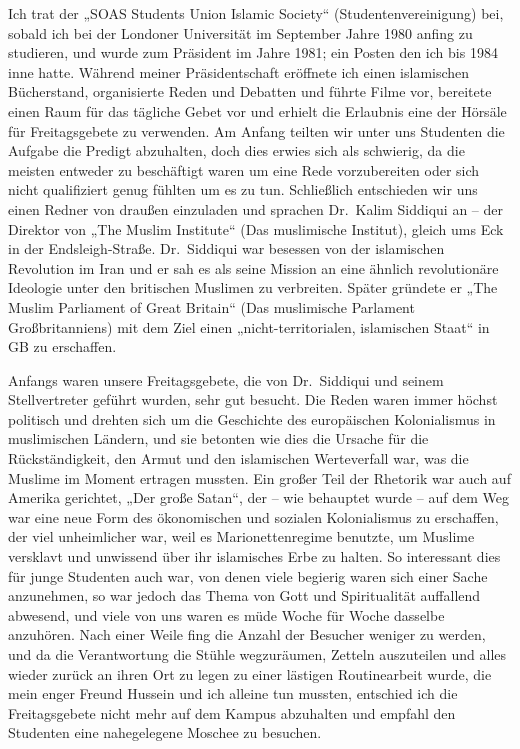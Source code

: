 \documentclass[12pt]{memoir}
\def\–{-\hskip0pt}
\begin{document}
Ich trat der „SOAS Students Union Islamic Society“ (Studentenvereinigung) bei,
sobald ich bei der Londoner Universität
im September Jahre 1980 anfing zu studieren,
und wurde zum Präsident im Jahre 1981;
ein Posten den ich bis 1984 inne hatte.
Während meiner Präsidentschaft eröffnete ich einen islamischen Bücherstand,
organisierte Reden und Debatten und führte Filme vor,
bereitete einen Raum für das tägliche Gebet vor
und erhielt die Erlaubnis eine der Hörsäle für Freitagsgebete zu verwenden.
Am Anfang teilten wir unter uns Studenten die Aufgabe die Predigt abzuhalten,
doch dies erwies sich als schwierig,
da die meisten entweder zu beschäftigt waren um eine Rede vorzubereiten
oder sich nicht qualifiziert genug fühlten um es zu tun.
Schließlich entschieden wir uns einen Redner von draußen einzuladen
und sprachen Dr.\ Kalim Siddiqui an –
der Direktor von „The Muslim Institute“ (Das muslimische Institut),
gleich ums Eck in der Endsleigh-Straße.
Dr.\ Siddiqui war besessen von der islamischen Revolution im Iran
und er sah es als seine Mission an eine ähnlich revolutionäre Ideologie
unter den britischen Muslimen zu verbreiten.
Später gründete er „The Muslim Parliament of Great Britain“
(Das muslimische Parlament Großbritanniens) mit dem Ziel
einen „nicht\–territorialen, islamischen Staat“ in GB zu erschaffen.

Anfangs waren unsere Freitagsgebete,
die von Dr.\ Siddiqui und seinem Stellvertreter geführt wurden,
sehr gut besucht.
Die Reden waren immer höchst politisch und drehten sich
um die Geschichte des europäischen Kolonialismus in muslimischen Ländern,
und sie betonten wie dies die Ursache für die Rückständigkeit,
den Armut und den islamischen Werteverfall war,
was die Muslime im Moment ertragen mussten.
Ein großer Teil der Rhetorik war auch auf Amerika gerichtet,
„Der große Satan“, der – wie behauptet wurde –
auf dem Weg war eine neue Form des ökonomischen
und sozialen Kolonialismus zu erschaffen, der viel unheimlicher war,
weil es Marionettenregime benutzte,
um Muslime versklavt und unwissend über ihr islamisches Erbe zu halten.
So interessant dies für junge Studenten auch war,
von denen viele begierig waren sich einer Sache anzunehmen,
so war jedoch das Thema von Gott und Spiritualität auffallend abwesend,
und viele von uns waren es müde Woche für Woche dasselbe anzuhören.
Nach einer Weile fing die Anzahl der Besucher weniger zu werden,
und da die Verantwortung die Stühle wegzuräumen,
Zetteln auszuteilen und alles wieder zurück an ihren Ort zu legen
zu einer lästigen Routinearbeit wurde,
die mein enger Freund Hussein und ich alleine tun mussten,
entschied ich die Freitagsgebete nicht mehr auf dem Kampus abzuhalten
und empfahl den Studenten eine nahegelegene Moschee zu besuchen.
\end{document}
